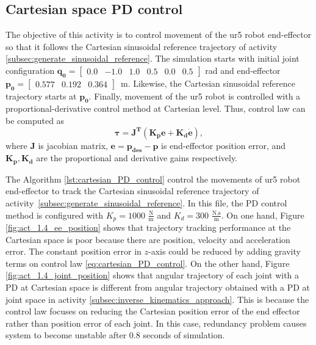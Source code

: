 \graphicspath{{images/act_1.4/}}
\subsection{Cartesian space PD control}
\label{subsec:cartesian_space_PD_control}
The objective of this activity is to control movement of the ur5 robot end-effector so that it follows the Cartesian sinusoidal reference trajectory of activity \ref{subsec:generate_sinusoidal_reference}. The simulation starts with initial joint configuration $\mathbf{q_0}=\begin{bmatrix} 0.0 & -1.0 & 1.0 & 0.5 & 0.0 & 0.5 \end{bmatrix}$ rad and end-effector $\mathbf{p_0}=\begin{bmatrix}  0.577 &   0.192 &   0.364 \end{bmatrix}$~m. Likewise, the Cartesian sinusoidal reference trajectory starts at $\mathbf{p_0}$. Finally, movement of the ur5 robot is controlled with a proportional-derivative control method at Cartesian level. Thus, control law can be computed as 
\begin{equation}
	\boldsymbol{\tau}
	= \mathbf{J^T} (\mathbf{K_p e} + \mathbf{K_d \dot{e}}),
	\label{eq:cartesian_PD_control}
\end{equation}
\noindent where $\mathbf{J}$ is jacobian matrix, $\mathbf{e}=\mathbf{p_{des} - p}$ is end-effector position error, and $\mathbf{K_p, K_d}$ are the proportional and derivative gains respectively. \vspace{.5cm}

The Algorithm \ref{lst:cartesian_PD_control} control the movements of ur5 robot end-effector to track the Cartesian sinusoidal reference trajectory of activity~\ref{subsec:generate_sinusoidal_reference}. In this file, the PD control method is configured with ${K_{p}}=1000$ $\mathrm{\frac{N}{m}}$ and $K_{d}= 300$ $\mathrm{\frac{N.s}{m}}$. On one hand, Figure \ref{fig:act_1.4_ee_position} shows that trajectory tracking performance at the Cartesian space is poor because there are position, velocity and acceleration error. The constant position error in $z$-axis could be reduced by adding gravity terms on control law \eqref{eq:cartesian_PD_control}. On the other hand, Figure \ref{fig:act_1.4_joint_position} shows that angular trajectory of each joint with a PD at Cartesian space is different from angular trajectory obtained with a PD at joint space in activity \ref{subsec:inverse_kinematics_approach}. This is because the control law focuses on reducing the Cartesian position error of the end effector rather than position error of each joint. In this case, redundancy problem causes system to become unstable after $0.8$ seconds of simulation.  \vspace{.5cm}

